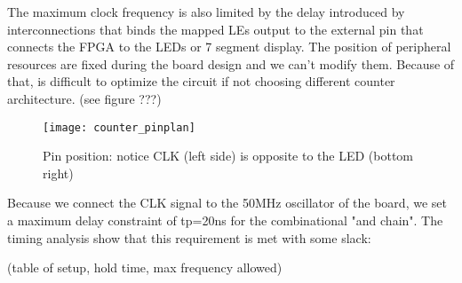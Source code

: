 The maximum clock frequency is also limited by the delay introduced by interconnections that binds the mapped LEs output to the external pin that connects the FPGA to the LEDs or 7 segment display. The position of peripheral resources are fixed during the board design and we can't modify them. Because of that, is difficult to optimize the circuit if not choosing different counter architecture. (see figure ???)

\begin{figure}
    \centering
    \texttt{[image: counter\_pinplan]}
    \caption{Pin position: notice CLK (left side) is opposite to the LED (bottom right)}
    \label{counterpinplan}
\end{figure}

Because we connect the CLK signal to the 50MHz oscillator of the board, we set a maximum delay constraint of tp=20ns for the combinational "and chain". The timing analysis show that this requirement is met with some slack:

(table of setup, hold time, max frequency allowed)
 